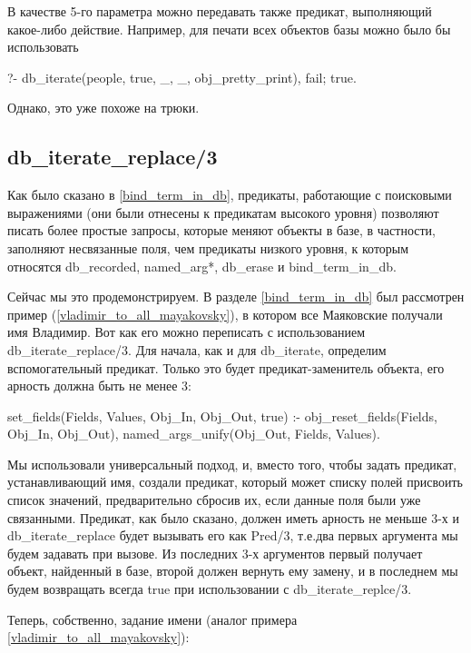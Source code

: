 \documentclass[a4paper]{book}
\def\te{т.\thinspace е.}
\def\na{named\_arg*}
\begin{document}
В качестве 5-го параметра можно передавать также предикат,
выполняющий какое-либо действие. Например, для печати всех
объектов базы можно было бы использовать

\begin{example}{}{}
?- db_iterate(people, true, _, _, obj_pretty_print), fail; true.
\end{example}

Однако, это уже похоже на трюки.

\subsection{db_iterate_replace/3}
\label{db_iterate_replace/3}

Как было сказано в \ref{bind_term_in_db}, предикаты, работающие с
поисковыми выражениями (они были отнесены к предикатам высокого
уровня) позволяют писать более простые запросы, которые меняют
объекты в базе, в частности, заполняют несвязанные поля, чем
предикаты низкого уровня, к которым относятся db_recorded, \na,
db_erase и bind_term_in_db.

Сейчас мы это продемонстрируем. В разделе \ref{bind_term_in_db}
был рассмотрен пример (\ref{vladimir_to_all_mayakovsky}), в
котором все Маяковские получали имя Владимир. Вот как его можно
переписать с использованием db_iterate_replace/3. Для начала, как
и для db_iterate, определим вспомогательный предикат. Только это
будет предикат-заменитель объекта, его арность должна быть не
менее 3:

\begin{example}{}{}
set_fields(Fields, Values, Obj_In, Obj_Out, true) :- 
   obj_reset_fields(Fields, Obj_In, Obj_Out), 
   named_args_unify(Obj_Out, Fields, Values). 
\end{example}

Мы использовали универсальный подход, и, вместо того, чтобы
задать предикат, устанавливающий имя, создали предикат, который
может списку полей присвоить список значений, предварительно
сбросив их, если данные поля были уже связанными. Предикат, как
было сказано, должен иметь арность не меньше 3-х и
db_iterate_replace будет вызывать его как Pred/3, \te два первых
аргумента мы будем задавать при вызове. Из последних 3-х
аргументов первый получает объект, найденный в базе, второй
должен вернуть ему замену, и в последнем мы будем возвращать
всегда true при использовании с db_iterate_replce/3.

Теперь, собственно, задание имени (аналог примера
\ref{vladimir_to_all_mayakovsky}):
\end{document}

